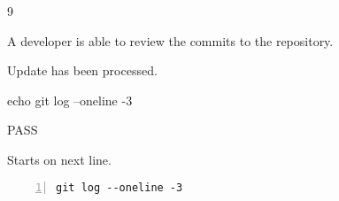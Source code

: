 \begin{description}[align=right,leftmargin=3.2cm,labelindent=3.0cm]
\item[Step:] 9
\item[Confirm:] A developer is able to review the commits to the repository.
\item[Expectation:] Update has been processed.
\item[Command:] echo git  log --oneline -3
\item[Test Result:] PASS
\item[Evidence:] Starts on next line.
\end{description}
\begin{lstlisting}[numbers=left]
git log --oneline -3

\end{lstlisting}
